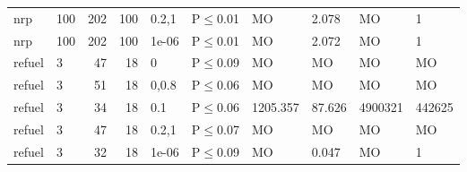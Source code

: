 \begin{longtable}{llrrllllll}
 nrp           & 100      &    	202 & 100 & 0.2,1 & P$\leq$0.01  & MO       & 2.078    & MO      & 1      \\
 nrp           & 100      &    	202 & 100 & 1e-06 & P$\leq$0.01  & MO       & 2.072    & MO      & 1      \\
 refuel        & 3        &     	47 &  18 & 0     & P$\leq$0.09  & MO       & MO       & MO      & MO     \\
 refuel        & 3        &     	51 &  18 & 0,0.8 & P$\leq$0.06  & MO       & MO       & MO      & MO     \\
 refuel        & 3        &     	34 &  18 & 0.1   & P$\leq$0.06  & 1205.357 & 87.626   & 4900321 & 442625 \\
 refuel        & 3        &     	47 &  18 & 0.2,1 & P$\leq$0.07  & MO       & MO       & MO      & MO     \\
 refuel        & 3        &     	32 &  18 & 1e-06 & P$\leq$0.09  & MO       & 0.047    & MO      & 1      \\
\bottomrule
\end{longtable}
